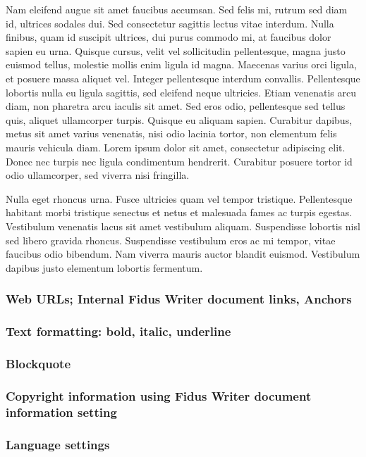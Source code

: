 \documentclass{article}
\begin{document}
Nam eleifend augue sit amet faucibus accumsan. Sed felis mi, rutrum sed diam id, ultrices sodales dui. Sed consectetur sagittis lectus vitae interdum. Nulla finibus, quam id suscipit ultrices, dui purus commodo mi, at faucibus dolor sapien eu urna. Quisque cursus, velit vel sollicitudin pellentesque, magna justo euismod tellus, molestie mollis enim ligula id magna. Maecenas varius orci ligula, et posuere massa aliquet vel. Integer pellentesque interdum convallis. Pellentesque lobortis nulla eu ligula sagittis, sed eleifend neque ultricies. Etiam venenatis arcu diam, non pharetra arcu iaculis sit amet. Sed eros odio, pellentesque sed tellus quis, aliquet ullamcorper turpis. Quisque eu aliquam sapien. Curabitur dapibus, metus sit amet varius venenatis, nisi odio lacinia tortor, non elementum felis mauris vehicula diam. Lorem ipsum dolor sit amet, consectetur adipiscing elit. Donec nec turpis nec ligula condimentum hendrerit. Curabitur posuere tortor id odio ullamcorper, sed viverra nisi fringilla.


Nulla eget rhoncus urna. Fusce ultricies quam vel tempor tristique. Pellentesque habitant morbi tristique senectus et netus et malesuada fames ac turpis egestas. Vestibulum venenatis lacus sit amet vestibulum aliquam. Suspendisse lobortis nisl sed libero gravida rhoncus. Suspendisse vestibulum eros ac mi tempor, vitae faucibus odio bibendum. Nam viverra mauris auctor blandit euismod. Vestibulum dapibus justo elementum lobortis fermentum.


\subsubsection{Web URLs; Internal Fidus Writer document links, Anchors}\label{H4364111}






\subsubsection{Text formatting: bold, italic, underline}\label{H284583}






\subsubsection{Blockquote}\label{H758728}






\subsubsection{Copyright information using Fidus Writer document information setting}\label{H3595888}






\subsubsection{Language settings}\label{H5763006}






\printbibliography[title={Bibliography}]
\end{document}
